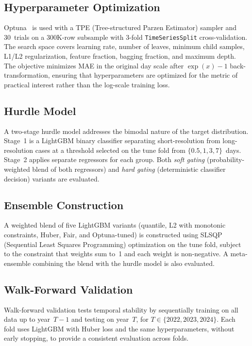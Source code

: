 \documentclass[sigconf,nonacm]{acmart}
\begin{document}
\subsection{Hyperparameter Optimization}

Optuna~\cite{akiba2019optuna} is used with a TPE (Tree-structured
Parzen Estimator) sampler and 30~trials on a 300K-row subsample
with 3-fold \texttt{TimeSeriesSplit} cross-validation. The search
space covers learning rate, number of leaves, minimum child
samples, L1/L2 regularization, feature fraction, bagging fraction,
and maximum depth. The objective minimizes MAE in the original day
scale after $\exp(x)-1$ back-transformation, ensuring that
hyperparameters are optimized for the metric of practical interest
rather than the log-scale training loss.

\subsection{Hurdle Model}

A two-stage hurdle model addresses the bimodal nature of the
target distribution. Stage~1 is a LightGBM binary classifier
separating short-resolution from long-resolution cases at a
threshold selected on the tune fold from
$\{0.5, 1, 3, 7\}$~days. Stage~2 applies separate regressors
for each group. Both \emph{soft gating} (probability-weighted
blend of both regressors) and \emph{hard gating} (deterministic
classifier decision) variants are evaluated.

\subsection{Ensemble Construction}

A weighted blend of five LightGBM variants (quantile, L2 with
monotonic constraints, Huber, Fair, and Optuna-tuned) is
constructed using SLSQP (Sequential Least Squares Programming)
optimization on the tune fold, subject to the constraint that
weights sum to~1 and each weight is non-negative. A
meta-ensemble combining the blend with the hurdle model is also
evaluated.

\subsection{Walk-Forward Validation}

Walk-forward validation tests temporal stability by
sequentially training on all data up to year~$T{-}1$ and testing
on year~$T$, for $T \in \{2022, 2023, 2024\}$. Each fold uses
LightGBM with Huber loss and the same hyperparameters, without
early stopping, to provide a consistent evaluation across folds.
\end{document}

